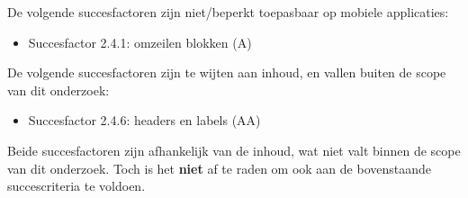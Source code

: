 De volgende succesfactoren zijn niet/beperkt toepasbaar op mobiele applicaties: 
\begin{itemize}
        \item Succesfactor 2.4.1: omzeilen blokken (A)



\end{itemize}

De volgende succesfactoren zijn te wijten aan inhoud, en vallen buiten de scope van dit onderzoek: 
\begin{itemize}

    \item Succesfactor 2.4.6: headers en labels (AA)
    
\end{itemize}
Beide succesfactoren zijn afhankelijk van de inhoud, wat niet valt binnen de scope van dit onderzoek. Toch is het \textbf{niet} af te raden om ook aan de bovenstaande succescriteria te voldoen. 
\newpage
